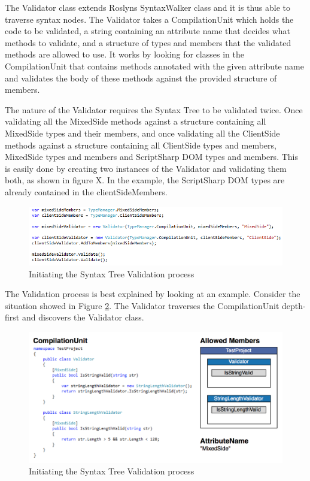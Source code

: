 		The Validator class extends Roslyns SyntaxWalker class and it is thus able to traverse syntax nodes. The Validator takes a CompilationUnit which holds the code to be validated, a string containing an attribute name that decides what methods to validate, and a structure of types and members that the validated methods are allowed to use. It works by looking for classes in the CompilationUnit that contains methods annotated with the given attribute name and validates the body of these methods against the provided structure of members.

		The nature of the Validator requires the Syntax Tree to be validated twice. Once validating all the MixedSide methods against a structure containing all MixedSide types and their members, and once validating all the ClientSide methods against a structure containing all ClientSide types and members, MixedSide types and members and ScriptSharp DOM types and members. This is easily done by creating two instances of the Validator and validating them both, as shown in figure X. In the example, the ScriptSharp DOM types are already contained in the clientSideMembers. 

		\begin{figure}[H]
			\begin{center}
				\centerline{\includegraphics[width=14cm]{resources/images/validatorInitiation.png}}
			\end{center}
			\caption{Initiating the Syntax Tree Validation process}
			\label{validatorInitiation}
		\end{figure}

		The Validation process is best explained by looking at an example. Consider the situation showed in Figure \ref{mixedSideValidationExample}. The Validator traverses the CompilationUnit depth-first and discovers the Validator class. 

		\begin{figure}[H]
			\begin{center}
				\centerline{\includegraphics[width=14cm]{resources/images/MixedSideValidationExample.png}}
			\end{center}
			\caption{Initiating the Syntax Tree Validation process}
			\label{mixedSideValidationExample}
		\end{figure}		
	
